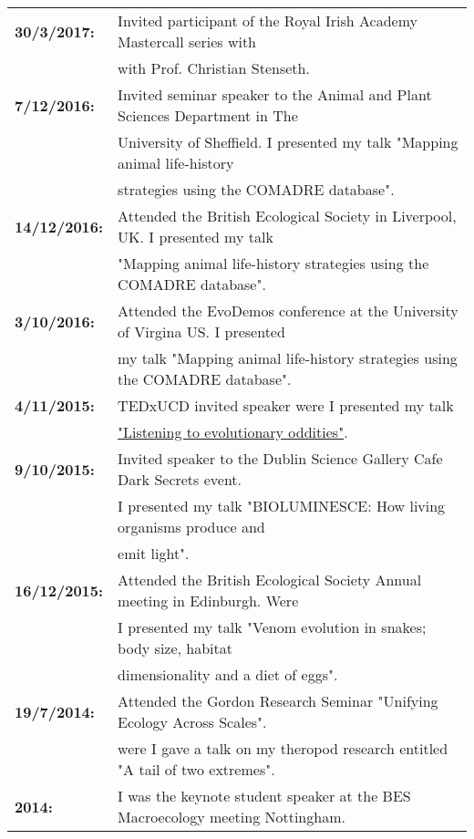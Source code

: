 \documentclass[10pt,a4paper]{article}
\begin{document}
\raggedright
\begin{tabular}{ll}
\textbf{30/3/2017:} & Invited participant of the Royal Irish Academy Mastercall series with\\
& with Prof. Christian Stenseth.\\
\textbf{7/12/2016:} & Invited seminar speaker to the Animal and Plant Sciences Department in The\\
& University of Sheffield. I presented my talk "Mapping animal life-history\\
& strategies using the COMADRE database".\\
\textbf{14/12/2016:} & Attended the British Ecological Society in Liverpool, UK. I presented my talk\\ 
& "Mapping animal life-history strategies using the COMADRE database".\\ 
\textbf{3/10/2016:} & Attended the EvoDemos conference at the University of Virgina US. I presented\\ 
& my talk "Mapping animal life-history strategies using the COMADRE database".\\
\textbf{4/11/2015:} & TEDxUCD invited speaker were I presented my talk\\
& \href{https://www.youtube.com/watch?v=-CHtfWEKifY}{"Listening to evolutionary oddities"}.\\ 
\textbf{9/10/2015:} & Invited speaker to the Dublin Science Gallery Cafe Dark Secrets event.\\ 
& I presented my talk "BIOLUMINESCE: How living organisms produce and\\ 
& emit light".\\
\textbf{16/12/2015:} & Attended the British Ecological Society Annual meeting in Edinburgh. Were\\ 
& I presented my talk "Venom evolution in snakes; body size, habitat\\
& dimensionality and a diet of eggs".\\
\textbf{19/7/2014:} & Attended the Gordon Research Seminar "Unifying Ecology Across Scales".\\ 
& were I gave a talk on my theropod research entitled "A tail of two extremes".\\
\textbf{2014:} & I was the keynote student speaker at the BES Macroecology meeting Nottingham.\\ 

\end{tabular}
\end{document}
